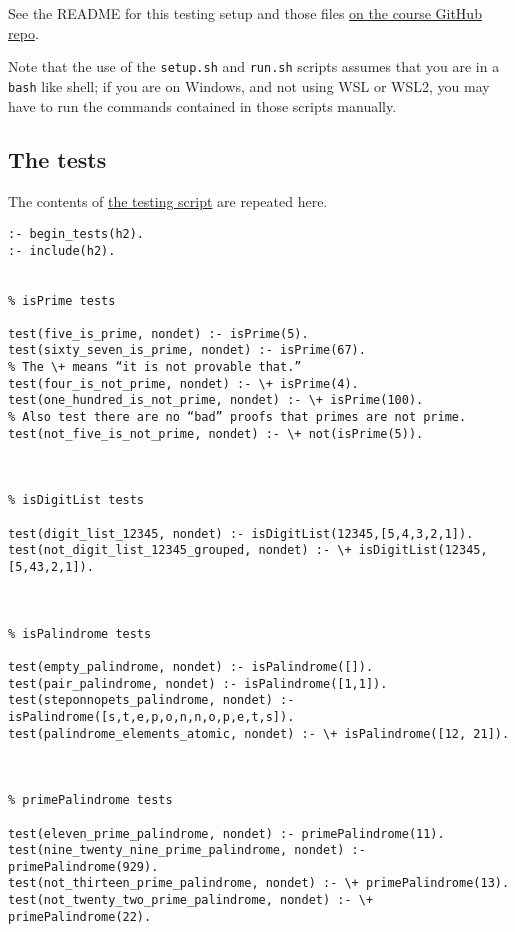 \documentclass[11pt]{article}
\begin{document}
See the README for this testing setup and those files
\href{https://github.com/armkeh/principles-of-programming-languages/tree/master/homework/testing/h2}{on the course GitHub repo}.

Note that the use of the \texttt{setup.sh} and \texttt{run.sh} scripts assumes
that you are in a \texttt{bash} like shell; if you are on Windows,
and not using WSL or WSL2, you may have
to run the commands contained in those scripts manually.

\subsection*{The tests}
\label{sec:org8d33ac8}
The contents of
\href{./testing/h2/h2.plt}{the testing script}
are repeated here.
\begin{verbatim}
:- begin_tests(h2).
:- include(h2).


% isPrime tests

test(five_is_prime, nondet) :- isPrime(5).
test(sixty_seven_is_prime, nondet) :- isPrime(67).
% The \+ means “it is not provable that.”
test(four_is_not_prime, nondet) :- \+ isPrime(4).
test(one_hundred_is_not_prime, nondet) :- \+ isPrime(100).
% Also test there are no “bad” proofs that primes are not prime.
test(not_five_is_not_prime, nondet) :- \+ not(isPrime(5)).



% isDigitList tests

test(digit_list_12345, nondet) :- isDigitList(12345,[5,4,3,2,1]).
test(not_digit_list_12345_grouped, nondet) :- \+ isDigitList(12345,[5,43,2,1]).



% isPalindrome tests

test(empty_palindrome, nondet) :- isPalindrome([]).
test(pair_palindrome, nondet) :- isPalindrome([1,1]).
test(steponnopets_palindrome, nondet) :- isPalindrome([s,t,e,p,o,n,n,o,p,e,t,s]).
test(palindrome_elements_atomic, nondet) :- \+ isPalindrome([12, 21]).



% primePalindrome tests

test(eleven_prime_palindrome, nondet) :- primePalindrome(11).
test(nine_twenty_nine_prime_palindrome, nondet) :- primePalindrome(929).
test(not_thirteen_prime_palindrome, nondet) :- \+ primePalindrome(13).
test(not_twenty_two_prime_palindrome, nondet) :- \+ primePalindrome(22).
\end{verbatim}
\end{document}
